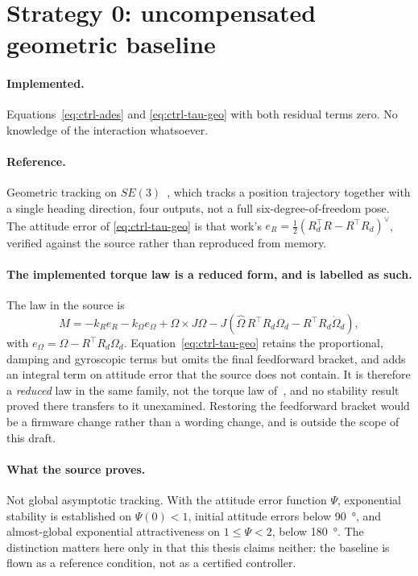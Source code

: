 \section{Strategy 0: uncompensated geometric baseline}
\label{sec:ctrl-s0}

\paragraph{Implemented.} Equations~\eqref{eq:ctrl-ades} and \eqref{eq:ctrl-tau-geo} with both
residual terms zero. No knowledge of the interaction whatsoever.

\paragraph{Reference.} Geometric tracking on $SE(3)$~\cite{lee2010geometrictracking}, which tracks
a position trajectory together with a single heading direction, four outputs, not a full
six-degree-of-freedom pose. The attitude error of \eqref{eq:ctrl-tau-geo} is that work's
$e_R = \tfrac{1}{2}(R_d^\top R - R^\top R_d)^\vee$, verified against the source rather than
reproduced from memory.

\paragraph{The implemented torque law is a reduced form, and is labelled as such.} The law in the
source is
%
\begin{equation}
  M = -k_R e_R - k_\Omega e_\Omega + \Omega \times J\Omega
      - J\!\left( \hat{\Omega}\, R^\top R_d \Omega_d - R^\top R_d \dot{\Omega}_d \right),
  \label{eq:ctrl-tau-lee}
\end{equation}
%
with $e_\Omega = \Omega - R^\top R_d \Omega_d$. Equation~\eqref{eq:ctrl-tau-geo} retains the
proportional, damping and gyroscopic terms but omits the final feedforward bracket, and adds an
integral term on attitude error that the source does not contain. It is therefore a
\emph{reduced} law in the same family, not the torque law of~\cite{lee2010geometrictracking}, and
no stability result proved there transfers to it unexamined. Restoring the feedforward bracket
would be a firmware change rather than a wording change, and is outside the scope of this draft.

\paragraph{What the source proves.} Not global asymptotic tracking. With the attitude error
function $\Psi$, exponential stability is established on $\Psi(0) < 1$, initial attitude errors
below \SI{90}{\degree}, and almost-global exponential attractiveness on $1 \le \Psi < 2$,
below \SI{180}{\degree}. The distinction matters here only in that this thesis claims neither: the
baseline is flown as a reference condition, not as a certified controller.


